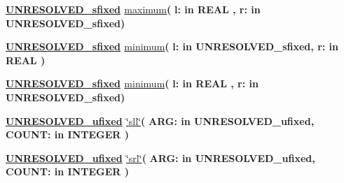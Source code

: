 \begin{DoxyCompactItemize}
\item 
{\bfseries {\bfseries {\bfseries \hyperlink{classfixed__pkg_aa723b28a027c3c0f9bca02d75e8df4d6}{U\+N\+R\+E\+S\+O\+L\+V\+E\+D\+\_\+sfixed}} \textcolor{vhdlchar}{ }}} \hyperlink{classfixed__pkg_a427ed4c94126ca4966f81712b325a314}{maximum}{\bfseries  ( }{\bfseries \textcolor{vhdlchar}{l\+: }\textcolor{stringliteral}{in }{\bfseries \textcolor{comment}{R\+E\+A\+L}\textcolor{vhdlchar}{ }}}{\bfseries  , \textcolor{vhdlchar}{r\+: }\textcolor{stringliteral}{in }\textcolor{vhdlchar}{U\+N\+R\+E\+S\+O\+L\+V\+E\+D\+\_\+sfixed}}{\bfseries  )} 
\item 
{\bfseries {\bfseries {\bfseries \hyperlink{classfixed__pkg_aa723b28a027c3c0f9bca02d75e8df4d6}{U\+N\+R\+E\+S\+O\+L\+V\+E\+D\+\_\+sfixed}} \textcolor{vhdlchar}{ }}} \hyperlink{classfixed__pkg_ac6e7f426014fe929a97c17a175463b51}{minimum}{\bfseries  ( }{\bfseries \textcolor{vhdlchar}{l\+: }\textcolor{stringliteral}{in }\textcolor{vhdlchar}{U\+N\+R\+E\+S\+O\+L\+V\+E\+D\+\_\+sfixed}}{\bfseries  , \textcolor{vhdlchar}{r\+: }\textcolor{stringliteral}{in }{\bfseries \textcolor{comment}{R\+E\+A\+L}\textcolor{vhdlchar}{ }}}{\bfseries  )} 
\item 
{\bfseries {\bfseries {\bfseries \hyperlink{classfixed__pkg_aa723b28a027c3c0f9bca02d75e8df4d6}{U\+N\+R\+E\+S\+O\+L\+V\+E\+D\+\_\+sfixed}} \textcolor{vhdlchar}{ }}} \hyperlink{classfixed__pkg_ac6e7f426014fe929a97c17a175463b51}{minimum}{\bfseries  ( }{\bfseries \textcolor{vhdlchar}{l\+: }\textcolor{stringliteral}{in }{\bfseries \textcolor{comment}{R\+E\+A\+L}\textcolor{vhdlchar}{ }}}{\bfseries  , \textcolor{vhdlchar}{r\+: }\textcolor{stringliteral}{in }\textcolor{vhdlchar}{U\+N\+R\+E\+S\+O\+L\+V\+E\+D\+\_\+sfixed}}{\bfseries  )} 
\item 
{\bfseries {\bfseries {\bfseries \hyperlink{classfixed__pkg_ae78bc2b36d22f6abeac163955e8a587d}{U\+N\+R\+E\+S\+O\+L\+V\+E\+D\+\_\+ufixed}} \textcolor{vhdlchar}{ }}} \hyperlink{classfixed__pkg_aad968eb6805375f56208595b46969395}{\char`\"{}sll\char`\"{}}{\bfseries  ( }{\bfseries \textcolor{vhdlchar}{A\+R\+G\+: }\textcolor{stringliteral}{in }\textcolor{vhdlchar}{U\+N\+R\+E\+S\+O\+L\+V\+E\+D\+\_\+ufixed}}{\bfseries  , \textcolor{vhdlchar}{C\+O\+U\+N\+T\+: }\textcolor{stringliteral}{in }{\bfseries \textcolor{comment}{I\+N\+T\+E\+G\+E\+R}\textcolor{vhdlchar}{ }}}{\bfseries  )} 
\item 
{\bfseries {\bfseries {\bfseries \hyperlink{classfixed__pkg_ae78bc2b36d22f6abeac163955e8a587d}{U\+N\+R\+E\+S\+O\+L\+V\+E\+D\+\_\+ufixed}} \textcolor{vhdlchar}{ }}} \hyperlink{classfixed__pkg_aa5150cdcb54496878a67845683c19d7b}{\char`\"{}srl\char`\"{}}{\bfseries  ( }{\bfseries \textcolor{vhdlchar}{A\+R\+G\+: }\textcolor{stringliteral}{in }\textcolor{vhdlchar}{U\+N\+R\+E\+S\+O\+L\+V\+E\+D\+\_\+ufixed}}{\bfseries  , \textcolor{vhdlchar}{C\+O\+U\+N\+T\+: }\textcolor{stringliteral}{in }{\bfseries \textcolor{comment}{I\+N\+T\+E\+G\+E\+R}\textcolor{vhdlchar}{ }}}{\bfseries  )} 

\end{DoxyCompactItemize}
